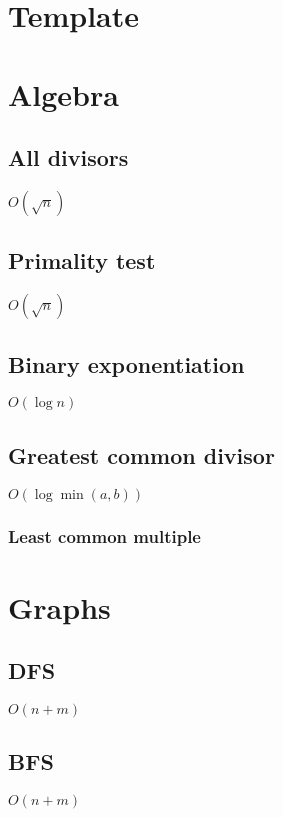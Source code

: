 \documentclass{article}
\begin{document}
\tableofcontents 

\section{Template}


\section{Algebra}
\subsection{All divisors}
$O(\sqrt{n})$


\subsection{Primality test}
$O(\sqrt{n})$


\subsection{Binary exponentiation}
$O(\log n)$


\subsection{Greatest common divisor}
$O(\log \min (a, b))$

\subsubsection{Least common multiple}


\section{Graphs}
\subsection{DFS}
$O(n+m)$


\subsection{BFS}
$O(n+m)$

\end{document}
